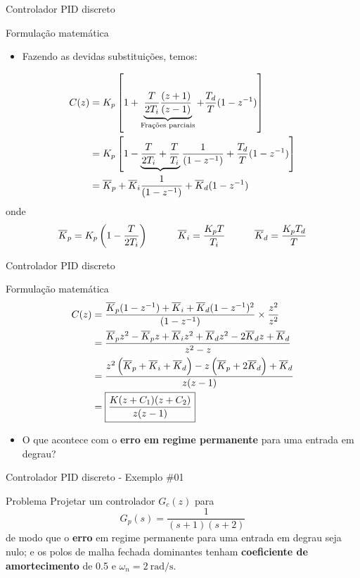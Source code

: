\begin{frame}{Controlador PID discreto}
\begin{block}{Formulação matemática}
\begin{itemize}
    \item Fazendo as devidas substituições, temos:
\end{itemize}
	\begin{align*}
	C(z)&=K_p\left[ 1+\underbrace{\dfrac{T}{2T_i}\dfrac{(z+1)}{(z-1)}}_{\text{Frações parciais}}+\dfrac{T_d}{T}(1-z^{-1})\right] \\
	&=K_p\left[ 1-\underbrace{\dfrac{T}{2T_i}+\dfrac{T}{T_i}}\dfrac{1}{(1-z^{-1})}+\dfrac{T_d}{T}(1-z^{-1})\right] \\
	&=\overline{K}_p +\overline{K}_i \dfrac{1}{(1-z^{-1})}+\overline{K}_d (1-z^{-1})
	\end{align*}
\vspace{-0.2cm}
onde
\vspace{-0.2cm}
$$\overline{K}_p =K_p\left(1-\dfrac{T}{2T_i}\right) \quad \quad \quad \overline{K}_i = \dfrac{K_p T}{T_i} \quad \quad \quad \overline{K}_d = \dfrac{K_p T_d}{T}$$
\end{block}
\end{frame}


\begin{frame}{Controlador PID discreto}
	\begin{block}{Formulação matemática}
\vspace{0.4cm}
		\begin{align*}
		C(z)&=\dfrac{\overline{K}_p (1-z^{-1})+\overline{K}_i +\overline{K}_d (1-z^{-1})^{2}}{(1-z^{-1})}\times\dfrac{z^{2}}{z^{2}}\\
		&=\dfrac{\overline{K}_p z^{2}-\overline{K}_p z+\overline{K}_i z^{2}+\overline{K}_d z^{2}-2\overline{K}_d z+\overline{K}_d }{z^{2}-z} \\
		&=\dfrac{z^{2}\left( \overline{K}_p +\overline{K}_i +\overline{K}_d  \right) -z\left( \overline{K}_p +2\overline{K}_d \right) +\overline{K}_d }{z(z-1)} \\
		&=\boxed{\dfrac{K(z+C_1)(z+C_2)}{z(z-1)}}
		\end{align*}
\begin{itemize}
    \item O que acontece com o \textbf{erro em regime permanente} para uma entrada em degrau?
\end{itemize}
	\end{block}
\end{frame}


\begin{frame}{Controlador PID discreto - Exemplo \#01}
\begin{block}{Problema}
	Projetar um controlador $ G_c(z) $ para 
	$$ G_p(s)=\dfrac{1}{(s+1)(s+2)} $$
	de modo que o \textbf{erro} em regime permanente para uma entrada em degrau seja nulo; e os polos de malha fechada dominantes tenham \textbf{coeficiente de amortecimento} de \num{0,5} e $ \omega_n=\SI{2}{\radian\per\second} $.
\end{block}
\end{frame}


